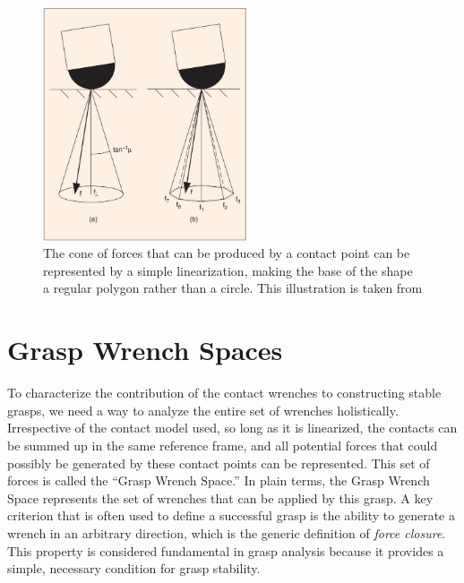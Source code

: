\begin{figure}
\centering
\includegraphics[width=6cm]{friction_cone_linearization.png}
\caption{The cone of forces that can be produced by a contact point can be represented by a simple linearization, making the base of the shape a regular polygon rather than a circle.  This illustration is taken from \protect\cite{Miller2004}}
\label{fig:friction-cone-linearization}
\end{figure}



\section{Grasp Wrench Spaces}
To characterize the contribution of the contact wrenches to constructing stable grasps, we need a way to analyze the entire set of wrenches holistically.  Irrespective of the contact model used, so long as it is linearized, the contacts can be summed up in the same reference frame, and all potential forces that could possibly be generated by these contact points can be represented. This set of forces is called the ``Grasp Wrench Space.''
In plain terms, the Grasp Wrench Space represents the set of wrenches that can be applied by this grasp.  A key criterion that is often used to define a successful grasp is the ability to generate a wrench in an arbitrary direction, which is the generic definition of \emph{force closure}.  This property is considered fundamental in grasp analysis because it provides a simple, necessary condition for grasp stability\cite{SalisburyThesis}. 
 

